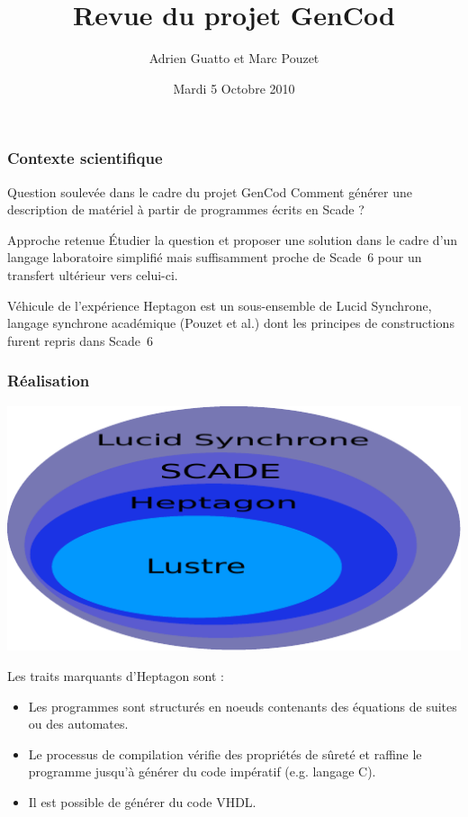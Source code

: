 \documentclass{beamer}
\title{Revue du projet GenCod}
\author{Adrien Guatto et Marc Pouzet}
\date{Mardi 5 Octobre 2010}
\newcommand{\lucy}{{\sc Lucid Synchrone}}
\newcommand{\scade}{{\sc Scade}}
\newcommand{\scadesix}{{\sc Scade~6}}
\newcommand{\heptagon}{{\sc Heptagon}}
\begin{document}

\begin{frame}[t,plain]
  \titlepage
\end{frame}

\begin{frame}
  \frametitle{Contexte scientifique}

  \begin{block}{Question soulevée dans le cadre du projet GenCod}
    Comment générer une description de matériel à partir de programmes écrits en
    \scade{} ?
  \end{block}

  \begin{block}{Approche retenue}
    Étudier la question et proposer une solution dans le cadre d'un langage
    laboratoire simplifié mais suffisamment proche de \scadesix{} pour un
    transfert ultérieur vers celui-ci.
  \end{block}

  \begin{block}{Véhicule de l'expérience}
    \heptagon{} est un sous-ensemble de \lucy{}, langage synchrone
    académique (Pouzet et al.) dont les principes de constructions furent repris
    dans \scadesix{}
  \end{block}
\end{frame}

\begin{frame}
  \frametitle{Réalisation}

  \begin{center}
    \includegraphics[scale=0.65]{comparo.pdf}
  \end{center}

  Les traits marquants d'\heptagon{} sont :

  \begin{itemize}
  \item Les programmes sont structurés en noeuds contenants des équations de
    suites ou des automates.
  \item Le processus de compilation vérifie des propriétés de sûreté et raffine
    le programme jusqu'à générer du code impératif (e.g. langage C).
  \item<alert@2-> Il est possible de générer du code VHDL.
  \end{itemize}
\end{frame}
\end{document}
